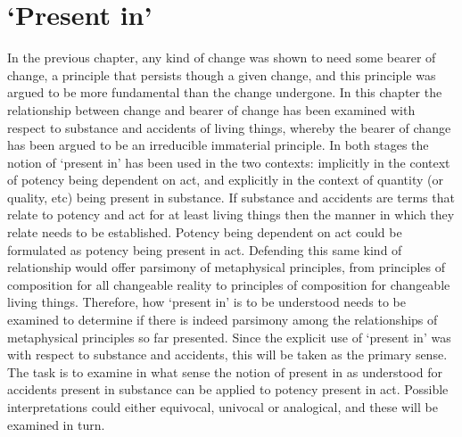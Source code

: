 \section{`Present in' }

In the previous chapter, any kind of change was shown to need some bearer of change, a principle that persists though a given change, and this principle was argued to be more fundamental than the change undergone. In this chapter the relationship between change and bearer of change has been examined with respect to substance and accidents of living things, whereby the bearer of change has been argued to be an irreducible immaterial principle. In both stages the notion of `present in' has been used in the two contexts: implicitly in the context of potency being dependent on act, and explicitly in the context of quantity (or quality, etc) being present in substance. If substance and accidents are terms that relate to potency and act for at least living things then the manner in which they relate needs to be established. Potency being dependent on act could be formulated as potency being present in act. Defending this same kind of relationship would offer parsimony of metaphysical principles, from principles of composition for all changeable reality to principles of composition for changeable living things. Therefore, how `present in' is to be understood needs to be examined to determine if there is indeed parsimony among the relationships of metaphysical principles so far presented. Since the explicit use of `present in' was with respect to substance and accidents, this will be taken as the primary sense. The task is to examine in what sense the notion of present in as understood for accidents present in substance can be applied to potency present in act. Possible interpretations could either equivocal, univocal or analogical, and these will be examined in turn.

